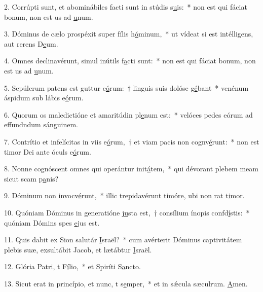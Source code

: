 2. Corrúpti sunt, et abominábiles facti sunt in stúdis s\uline{u}is:~* non est qui fáciat bonum, non est us ad \uline{u}num.\par 
3. Dóminus de cælo prospéxit super fílis h\uline{ó}minum,~* ut vídeat si est intélligens, aut rerens D\uline{e}um.\par 
4. Omnes declinavérunt, simul inútils f\uline{a}cti sunt:~* non est qui fáciat bonum, non est us ad \uline{u}num.\par 
5. Sepúlcrum patens est guttur e\uline{ó}rum:~† linguis suis dolóse g\uline{é}bant~* venénum áspidum sub lábis e\uline{ó}rum.\par 
6. Quorum os maledictióne et amaritúdin pl\uline{e}num est:~* velóces pedes eórum ad effundndum s\uline{á}nguinem.\par 
7. Contrítio et infelícitas in viis e\uline{ó}rum,~† et viam pacis non cognv\uline{é}runt:~* non est timor Dei ante óculs e\uline{ó}rum.\par 
8. Nonne cognóscent omnes qui operántur init\uline{á}tem,~* qui dévorant plebem meam sicut scam p\uline{a}nis?\par 
9. Dóminum non invocv\uline{é}runt,~* illic trepidavérunt timóre, ubi non rat t\uline{i}mor.\par 
10. Quóniam Dóminus in generatióne \uline{ju}sta est,~† consílium ínopis confd\uline{í}stis:~* quóniam Dómins spes \uline{e}jus est.\par 
11. Quis dabit ex Sion salutár \uline{I}sraël?~* cum avérterit Dóminus captivitátem plebis suæ, exsultábit Jacob, et lætábtur \uline{I}sraël.\par 
12. Glória Patri, t F\uline{í}lio,~* et Spiríti S\uline{a}ncto.\par 
13. Sicut erat in princípio, et nunc, t s\uline{e}mper,~* et in sǽcula sæculrum. \uline{A}men.\par 
